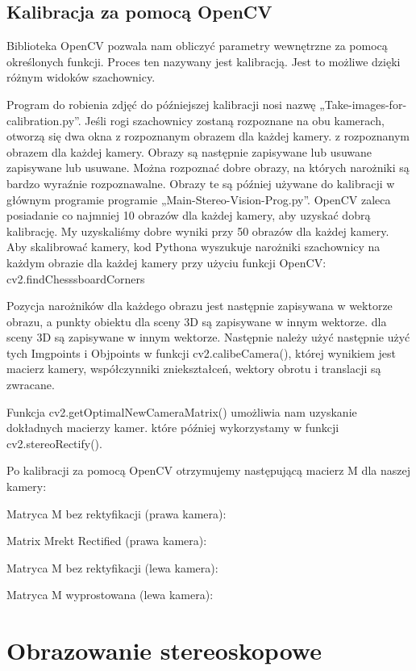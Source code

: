\documentclass[magisterska]{pracadypl}
\begin{document}
\subsection{Kalibracja za pomocą OpenCV}

Biblioteka OpenCV pozwala nam obliczyć parametry wewnętrzne za pomocą określonych funkcji.
Proces ten nazywany jest kalibracją. Jest to możliwe dzięki różnym
widoków szachownicy.

Program do robienia zdjęć do późniejszej kalibracji nosi nazwę
„Take-images-for-calibration.py”.
Jeśli rogi szachownicy zostaną rozpoznane na obu kamerach, otworzą się dwa okna z rozpoznanym obrazem dla każdej kamery.
z rozpoznanym obrazem dla każdej kamery. Obrazy są następnie zapisywane lub usuwane
zapisywane lub usuwane. Można rozpoznać dobre obrazy, na których narożniki
są bardzo wyraźnie rozpoznawalne. Obrazy te są później używane do kalibracji w głównym programie
programie „Main-Stereo-Vision-Prog.py”. OpenCV zaleca posiadanie co najmniej 10
obrazów dla każdej kamery, aby uzyskać dobrą kalibrację. My uzyskaliśmy dobre wyniki przy 50
obrazów dla każdej kamery.
Aby skalibrować kamery, kod Pythona wyszukuje narożniki szachownicy na każdym
obrazie dla każdej kamery przy użyciu funkcji OpenCV: cv2.findChesssboardCorners

Pozycja narożników dla każdego obrazu jest następnie zapisywana w wektorze obrazu, a punkty obiektu dla sceny 3D są zapisywane w innym wektorze.
dla sceny 3D są zapisywane w innym wektorze. Następnie należy użyć
następnie użyć tych Imgpoints i Objpoints w funkcji cv2.calibeCamera(), której wynikiem jest
macierz kamery, współczynniki zniekształceń, wektory obrotu i translacji
są zwracane.

Funkcja cv2.getOptimalNewCameraMatrix() umożliwia nam uzyskanie dokładnych macierzy kamer.
które później wykorzystamy w funkcji cv2.stereoRectify().

Po kalibracji za pomocą OpenCV otrzymujemy następującą macierz M dla naszej kamery:

Matryca M bez rektyfikacji (prawa kamera):

Matrix Mrekt Rectified (prawa kamera):

Matryca M bez rektyfikacji (lewa kamera):

Matryca M wyprostowana (lewa kamera):

\section{Obrazowanie stereoskopowe}
\end{document}
